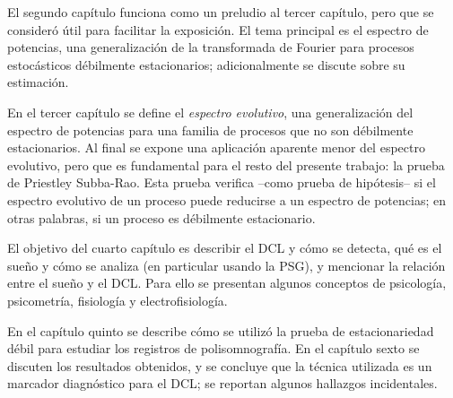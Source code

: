 \documentclass[12pt,letterpaper]{book}
\begin{document}
El segundo capítulo funciona como un preludio al tercer capítulo, pero que se consideró útil para facilitar la exposición.
%
El tema principal es el espectro de potencias, una generalización de la transformada de Fourier para procesos estocásticos débilmente estacionarios; adicionalmente se discute sobre su estimación.


En el tercer capítulo se define el \textit{espectro evolutivo}, una generalización del espectro de potencias para una familia de procesos que no son débilmente estacionarios.
%
Al final se expone una aplicación aparente menor del espectro evolutivo, pero que es fundamental para el resto del presente trabajo: la prueba de Priestley Subba-Rao. 
%
Esta prueba verifica --como prueba de hipótesis-- si el espectro evolutivo de un proceso puede reducirse a un espectro de potencias; en otras palabras, si un proceso es débilmente estacionario.

El objetivo del cuarto capítulo es describir el DCL y cómo se detecta, qué es el sueño y cómo se analiza (en particular usando la PSG), y mencionar la relación entre el sueño y el DCL.
%
Para ello se presentan algunos conceptos de psicología, psicometría, fisiología y electrofisiología.

En el capítulo quinto se describe cómo se utilizó la prueba de estacionariedad débil para estudiar los registros de polisomnografía.
%
En el capítulo sexto se discuten los resultados obtenidos, y se concluye que la técnica utilizada es un marcador diagnóstico para el DCL; se reportan algunos hallazgos incidentales.
\end{document}
